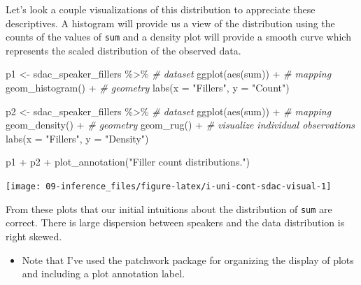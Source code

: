\documentclass[
]{article}
\newenvironment{Shaded}{\begin{snugshade}}{\end{snugshade}}
\newcommand{\AttributeTok}[1]{\textcolor[rgb]{0.77,0.63,0.00}{#1}}
\newcommand{\CommentTok}[1]{\textcolor[rgb]{0.56,0.35,0.01}{\textit{#1}}}
\newcommand{\FunctionTok}[1]{\textcolor[rgb]{0.00,0.00,0.00}{#1}}
\newcommand{\NormalTok}[1]{#1}
\newcommand{\OtherTok}[1]{\textcolor[rgb]{0.56,0.35,0.01}{#1}}
\newcommand{\SpecialCharTok}[1]{\textcolor[rgb]{0.00,0.00,0.00}{#1}}
\newcommand{\StringTok}[1]{\textcolor[rgb]{0.31,0.60,0.02}{#1}}
\newenvironment{rmdblock}[1]
  {\begin{shaded*}
  \begin{itemize}
  \renewcommand{\labelitemi}{
    \raisebox{-.5\height}[0pt][0pt]{
      {\setkeys{Gin}{width=2em,keepaspectratio}\texttt{[image: assets/images/\#1]}}
    }
  }
  \item
  }
  {
  \end{itemize}
  \end{shaded*}
  }
\newenvironment{rmdtip}
  {\begin{rmdblock}{tip}}
  {\end{rmdblock}}
\begin{document}
Let's look a couple visualizations of this distribution to appreciate these descriptives. A histogram will provide us a view of the distribution using the counts of the values of \texttt{sum} and a density plot will provide a smooth curve which represents the scaled distribution of the observed data.

\begin{Shaded}
\begin{Highlighting}[]
\NormalTok{p1 }\OtherTok{\textless{}{-}} 
\NormalTok{  sdac\_speaker\_fillers }\SpecialCharTok{\%\textgreater{}\%} \CommentTok{\# dataset}
  \FunctionTok{ggplot}\NormalTok{(}\FunctionTok{aes}\NormalTok{(sum)) }\SpecialCharTok{+} \CommentTok{\# mapping}
  \FunctionTok{geom\_histogram}\NormalTok{() }\SpecialCharTok{+}  \CommentTok{\# geometry}
  \FunctionTok{labs}\NormalTok{(}\AttributeTok{x =} \StringTok{"Fillers"}\NormalTok{, }\AttributeTok{y =} \StringTok{"Count"}\NormalTok{)}

\NormalTok{p2 }\OtherTok{\textless{}{-}} 
\NormalTok{  sdac\_speaker\_fillers }\SpecialCharTok{\%\textgreater{}\%} \CommentTok{\# dataset}
  \FunctionTok{ggplot}\NormalTok{(}\FunctionTok{aes}\NormalTok{(sum)) }\SpecialCharTok{+} \CommentTok{\# mapping}
  \FunctionTok{geom\_density}\NormalTok{() }\SpecialCharTok{+} \CommentTok{\# geometry}
  \FunctionTok{geom\_rug}\NormalTok{() }\SpecialCharTok{+}  \CommentTok{\# visualize individual observations}
  \FunctionTok{labs}\NormalTok{(}\AttributeTok{x =} \StringTok{"Fillers"}\NormalTok{, }\AttributeTok{y =} \StringTok{"Density"}\NormalTok{)}

\NormalTok{p1 }\SpecialCharTok{+}\NormalTok{ p2 }\SpecialCharTok{+} \FunctionTok{plot\_annotation}\NormalTok{(}\StringTok{"Filler count distributions."}\NormalTok{)}
\end{Highlighting}
\end{Shaded}

\begin{center}\texttt{[image: 09-inference\_files/figure-latex/i-uni-cont-sdac-visual-1]} \end{center}

From these plots that our initial intuitions about the distribution of \texttt{sum} are correct. There is large dispersion between speakers and the data distribution is right skewed.

\begin{rmdtip}
Note that I've used the patchwork package for organizing the display of
plots and including a plot annotation label.
\end{rmdtip}
\end{document}
